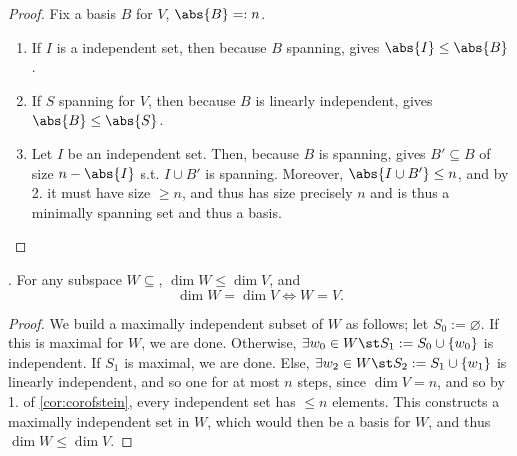 \begin{proof}
    Fix a basis $B$ for $V$, $\abs{B} =: n$.
    \begin{enumerate}
        \item If $I$ is a independent set, then because $B$ spanning,  gives $\abs{I} \leq \abs{B}$.
        \item If $S$ spanning for $V$, then because $B$ is linearly independent,  gives $\abs{B} \leq \abs{S}$.
        \item Let $I$ be an independent set. Then, because $B$ is spanning,  gives $B' \subseteq B$ of size $n - \abs{I}$ s.t. $I \cup B'$ is spanning. Moreover, $\abs{I \cup B'} \leq n$, and by 2. it must have size $\geq n$, and thus has size precisely $n$ and is thus a minimally spanning set and thus a basis.
    \end{enumerate}
\end{proof}

\begin{corollary}
     . For any subspace $W \subseteq $, $\dim W \leq \dim V$, and $$\dim W = \dim V \iff W = V.$$
\end{corollary}

\begin{proof}
    We build a maximally independent subset of $W$ as follows; let $S_0 := \varnothing$. If this is maximal for $W$, we are done. Otherwise, $\exists w_0 \in W \st S_1 := S_0 \cup \{w_0\}$ is independent. If $S_1$ is maximal, we are done. Else, $\exists w_2 \in W \st S_2 := S_1 \cup \{w_1\}$ is linearly independent, and so one for at most $n$ steps, since $\dim V = n$, and so by 1. of \cref{cor:corofstein}, every independent set has $\leq n$ elements. This constructs a maximally independent set in $W$, which would then be a basis for $W$, and thus $\dim W \leq \dim V$.

    
\end{proof}